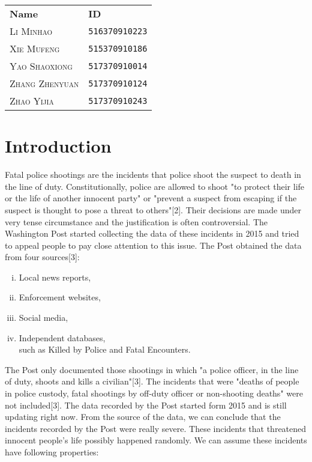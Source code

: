 \documentclass[11pt,a4paper,english]{article}
\begin{document}
\begin{table}[h!]
\centering
\begin{tabular}{ll}
\textbf{Name} & \textbf{ID} \\
\textsc{Li Minhao} & \texttt{516370910223} \\
\textsc{Xie Mufeng} &  \texttt{515370910186} \\
\textsc{Yao Shaoxiong} & \texttt{517370910014} \\
\textsc{Zhang Zhenyuan} & \texttt{517370910124} \\
\textsc{Zhao Yijia} &  \texttt{517370910243} \\
\end{tabular}
\end{table}
\newpage
\begin{abstract}
\end{abstract}
\newpage
\tableofcontents
\newpage\section{Introduction}
Fatal police shootings are the incidents that police shoot the suspect to death in the line of duty. Constitutionally, police are allowed to shoot "to protect their life or the life of another innocent party" or "prevent a suspect from escaping if the suspect is thought to pose a threat to others"[2]. Their decisions are made under very tense circumstance and the justification is often controversial. The Washington Post started collecting the data of these incidents in 2015 and tried to appeal people to pay close attention to this issue. The Post obtained the data from four sources[3]: 
\begin{enumerate}[(i)]
    \item Local news reports, 
    \item Enforcement websites, 
    \item Social media,
	\item Independent databases, \\
	such as Killed by Police and Fatal Encounters. 
\end{enumerate}
The Post only documented those shootings in which "a police officer, in the line of duty, shoots and kills a civilian"[3]. The incidents that were "deaths of people in police custody, fatal shootings by off-duty officer or non-shooting deaths" were not included[3]. The data recorded by the Post started form 2015 and is still updating right now. From the source of the data, we can conclude that the incidents recorded by the Post were really severe. These incidents that threatened innocent people's life possibly happened randomly. We can assume these incidents have following properties:
\end{document}
